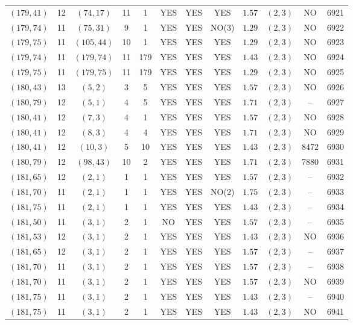 \begin{longtable}{|c|c|c|c|c|c|c|c|c|c|c|c|}
$(179,41)$ & 12 & $(74,17)$ & 11 & 1 & YES & YES & YES & $1.57$ & $(2,3)$ & NO & 6921\\
$(179,74)$ & 11 & $(75,31)$ & 9 & 1 & YES & YES & NO(3) & $1.29$ & $(2,3)$ & NO & 6922\\
$(179,75)$ & 11 & $(105,44)$ & 10 & 1 & YES & YES & YES & $1.29$ & $(2,3)$ & NO & 6923\\
$(179,74)$ & 11 & $(179,74)$ & 11 & 179 & YES & YES & YES & $1.43$ & $(2,3)$ & NO & 6924\\
$(179,75)$ & 11 & $(179,75)$ & 11 & 179 & YES & YES & YES & $1.29$ & $(2,3)$ & NO & 6925\\
$(180,43)$ & 13 & $(5,2)$ & 3 & 5 & YES & YES & YES & $1.57$ & $(2,3)$ & NO & 6926\\
$(180,79)$ & 12 & $(5,1)$ & 4 & 5 & YES & YES & YES & $1.71$ & $(2,3)$ & -- & 6927\\
$(180,41)$ & 12 & $(7,3)$ & 4 & 1 & YES & YES & YES & $1.57$ & $(2,3)$ & NO & 6928\\
$(180,41)$ & 12 & $(8,3)$ & 4 & 4 & YES & YES & YES & $1.71$ & $(2,3)$ & NO & 6929\\
$(180,41)$ & 12 & $(10,3)$ & 5 & 10 & YES & YES & YES & $1.43$ & $(2,3)$ & 8472 & 6930\\
$(180,79)$ & 12 & $(98,43)$ & 10 & 2 & YES & YES & YES & $1.71$ & $(2,3)$ & 7880 & 6931\\
$(181,65)$ & 12 & $(2,1)$ & 1 & 1 & YES & YES & YES & $1.57$ & $(2,3)$ & -- & 6932\\
$(181,70)$ & 11 & $(2,1)$ & 1 & 1 & YES & YES & NO(2) & $1.75$ & $(2,3)$ & -- & 6933\\
$(181,75)$ & 11 & $(2,1)$ & 1 & 1 & YES & YES & YES & $1.43$ & $(2,3)$ & -- & 6934\\
$(181,50)$ & 11 & $(3,1)$ & 2 & 1 & NO & YES & YES & $1.57$ & $(2,3)$ & -- & 6935\\
$(181,53)$ & 12 & $(3,1)$ & 2 & 1 & YES & YES & YES & $1.43$ & $(2,3)$ & NO & 6936\\
$(181,65)$ & 12 & $(3,1)$ & 2 & 1 & YES & YES & YES & $1.57$ & $(2,3)$ & -- & 6937\\
$(181,70)$ & 11 & $(3,1)$ & 2 & 1 & YES & YES & YES & $1.57$ & $(2,3)$ & -- & 6938\\
$(181,70)$ & 11 & $(3,1)$ & 2 & 1 & YES & YES & YES & $1.57$ & $(2,3)$ & NO & 6939\\
$(181,75)$ & 11 & $(3,1)$ & 2 & 1 & YES & YES & YES & $1.43$ & $(2,3)$ & -- & 6940\\
$(181,75)$ & 11 & $(3,1)$ & 2 & 1 & YES & YES & YES & $1.43$ & $(2,3)$ & NO & 6941\\

\end{longtable}
